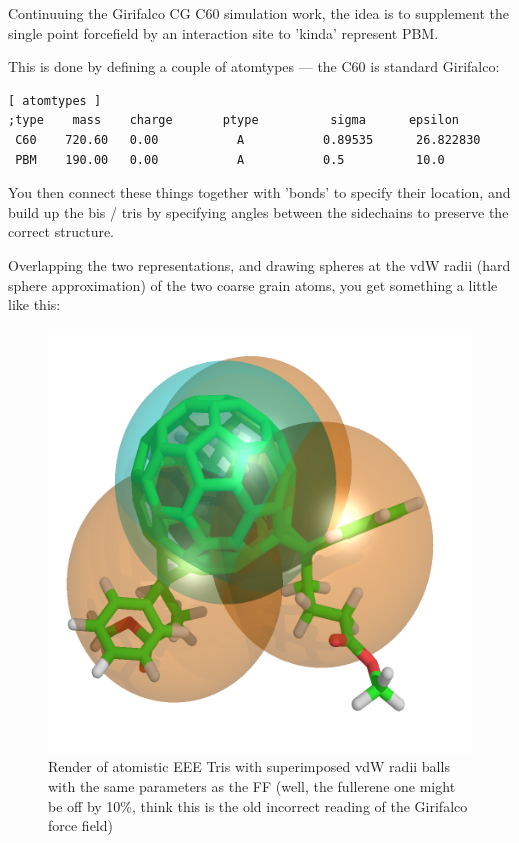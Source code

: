 \documentclass[hyperref]{labbook}
\author{Jarvist Moore Frost}
\date{Jan 5th, 2010}
\begin{document}


Continuuing the Girifalco CG C60 simulation work, the idea is to supplement the
single point forcefield by an interaction site to 'kinda' represent PBM.

This is done by defining a couple of atomtypes --- the C60 is standard Girifalco:
\begin{verbatim}
[ atomtypes ]
;type    mass    charge       ptype          sigma      epsilon
 C60    720.60   0.00           A           0.89535      26.822830
 PBM    190.00   0.00           A           0.5          10.0
\end{verbatim}

You then connect these things together with 'bonds' to specify their location,
and build up the bis / tris by specifying angles between the sidechains to
preserve the correct structure.


Overlapping the two representations, and drawing spheres at the vdW radii (hard
sphere approximation) of the two coarse grain atoms, you get something a little
like this:

\begin{figure}[h!]
\centering
\includegraphics[width=0.8\columnwidth]{./figs/tris-CG-render.png}
\caption{\label{tris-CG-render}
Render of atomistic EEE Tris with superimposed vdW radii balls with the same parameters as the FF (well, the fullerene one might be off by 10\%, think this is the old incorrect reading of the Girifalco force field)
}
\end{figure}
\end{document}
